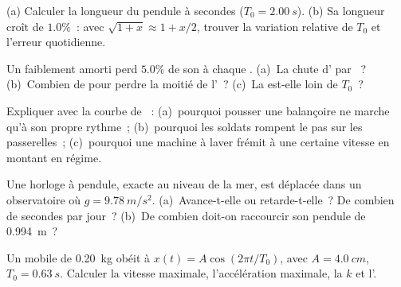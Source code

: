 \begin{exercise}[$\star\star$]\label{exo:g12:oscillators-and-time:9}
(a) Calculer la longueur du pendule à secondes ($T_0 =
\qty{2.00}{s}$). (b) Sa longueur croît de $1.0\%$~: avec
$\sqrt{1+x} \approx 1 + x/2$, trouver la variation relative de $T_0$
et l'erreur quotidienne.
\end{exercise}

\begin{exercise}[$\star\star$]\label{exo:g12:oscillators-and-time:10}
Un  faiblement
amorti perd $5.0\%$ de son
 à chaque . (a)~La chute
d' par ~? (b)~Combien de
 pour perdre la moitié de
l'~? (c)~La  est-elle
loin de $T_0$~?
\end{exercise}

\begin{exercise}[$\star\star$]\label{exo:g12:oscillators-and-time:11}
Expliquer avec la courbe de ~: (a)~pourquoi
pousser une balançoire ne marche qu'à son propre rythme~;
(b)~pourquoi les soldats rompent le pas sur les passerelles~;
(c)~pourquoi une machine à laver frémit à une certaine vitesse en
montant en régime.
\end{exercise}

\begin{exercise}[$\star\star\star$]\label{exo:g12:oscillators-and-time:12}
Une horloge à pendule, exacte au niveau de la mer, est déplacée dans
un observatoire où $g = \qty{9.78}{m/s^2}$. (a)~Avance-t-elle ou
retarde-t-elle~? De combien de secondes par jour~? (b)~De combien
doit-on raccourcir son pendule de \qty{0.994}{m}~?
\end{exercise}

\begin{exercise}[$\star\star\star$]\label{exo:g12:oscillators-and-time:13}
Un mobile de \qty{0.20}{kg} obéit à $x(t) = A\cos(2\pi t/T_0)$, avec
$A = \qty{4.0}{cm}$, $T_0 = \qty{0.63}{s}$. Calculer la vitesse
maximale, l'accélération maximale, la  $k$ et
l'.
\end{exercise}

